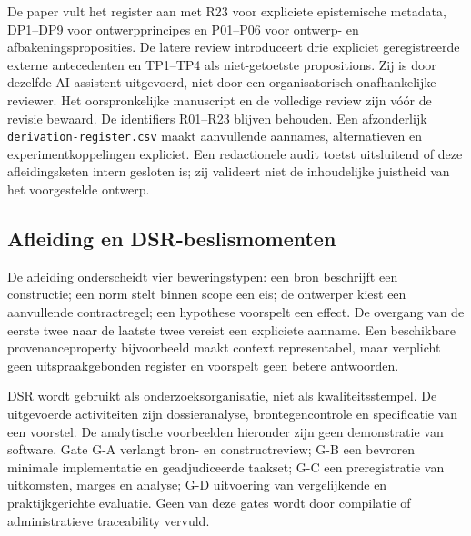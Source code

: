 De paper vult het register aan met R23 voor expliciete epistemische metadata, DP1--DP9 voor ontwerpprincipes en P01--P06 voor ontwerp- en afbakeningsproposities. De latere review introduceert drie expliciet geregistreerde externe antecedenten en TP1--TP4 als niet-getoetste propositions. Zij is door dezelfde AI-assistent uitgevoerd, niet door een organisatorisch onafhankelijke reviewer. Het oorspronkelijke manuscript en de volledige review zijn vóór de revisie bewaard. De identifiers R01--R23 blijven behouden. Een afzonderlijk \texttt{derivation-register.csv} maakt aanvullende aannames, alternatieven en experimentkoppelingen expliciet. Een redactionele audit toetst uitsluitend of deze afleidingsketen intern gesloten is; zij valideert niet de inhoudelijke juistheid van het voorgestelde ontwerp.

\subsection{Afleiding en DSR-beslismomenten}
De afleiding onderscheidt vier beweringstypen: een bron beschrijft een constructie; een norm stelt binnen scope een eis; de ontwerper kiest een aanvullende contractregel; een hypothese voorspelt een effect. De overgang van de eerste twee naar de laatste twee vereist een expliciete aanname. Een beschikbare provenanceproperty bijvoorbeeld maakt context representabel, maar verplicht geen uitspraakgebonden register en voorspelt geen betere antwoorden. \citep{S33}

DSR wordt gebruikt als onderzoeksorganisatie, niet als kwaliteitsstempel. De uitgevoerde activiteiten zijn dossieranalyse, brontegencontrole en specificatie van een voorstel. De analytische voorbeelden hieronder zijn geen demonstratie van software. Gate G-A verlangt bron- en constructreview; G-B een bevroren minimale implementatie en geadjudiceerde taakset; G-C een preregistratie van uitkomsten, marges en analyse; G-D uitvoering van vergelijkende en praktijkgerichte evaluatie. Geen van deze gates wordt door compilatie of administratieve traceability vervuld. \citep{L02,L03}
